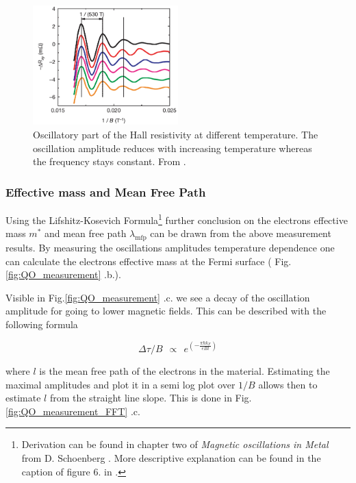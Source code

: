 \documentclass[10pt]{report}
\numberwithin{equation}{chapter}
\newcommand{\myRef}[1]{
  Fig.\ref{#1}
}
\begin{document}
\begin{figure}
  \centering
  \includegraphics[width=0.5\textwidth]{../img/QO_measurement_temp.png}
  \caption{Oscillatory part of the Hall resistivity at different temperature. The oscillation amplitude reduces with increasing temperature whereas the frequency stays constant. From \cite{Doiron-Leyraud2007}.}
  \label{fig:QO_measurement_temp}
\end{figure}


\subsubsection{Effective mass and Mean Free Path}

Using the Lifshitz-Kosevich Formula\footnote{Derivation can be found in chapter two of \textit{Magnetic oscillations in Metal} from D. Schoenberg \cite{Shoenberg1984}. More descriptive explanation can be found in the caption of figure 6. in \cite{Sebastian2015}.} further conclusion on the electrons effective mass $m^*$ and mean free path $\lambda_\text{mfp}$ can be drawn from the above measurement results. 
By measuring the oscillations amplitudes temperature dependence one can calculate the electrons effective mass at the Fermi surface (\myRef{fig:QO_measurement}.b.). 

Visible in \myRef{fig:QO_measurement}.c. we see a decay of the oscillation amplitude for going to lower magnetic fields. This can be described with the following formula

\begin{equation}
  \Delta \tau / B ~~\propto~~ e^{\left( -\frac{\pi \hbar k_F}{eB l} \right)}
\end{equation}

where $l$ is the mean free path of the electrons in the material. Estimating the maximal amplitudes and plot it in a semi log plot over $1/B$ allows then to estimate $l$ from the straight line slope. This is done in \myRef{fig:QO_measurement_FFT}.c.
\end{document}
